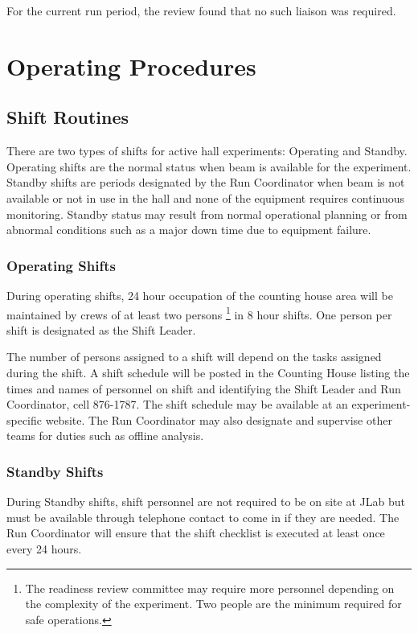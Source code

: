 \documentclass[11pt]{article}
\begin{document}
For the current run period, the review found that no such liaison was required. 


\section{Operating Procedures}

\subsection{Shift Routines}

There are two types of shifts for active hall experiments:
Operating and Standby. Operating shifts are the normal status
when beam is available for the experiment. Standby shifts are periods 
designated by the Run Coordinator when beam is not available or not in
use in the hall and none of the equipment requires
continuous monitoring. Standby status may result from normal operational
planning or from abnormal conditions such as a major down time due to
equipment failure.


\subsubsection{Operating Shifts}

During operating shifts, 24 hour occupation of the counting house area will 
be maintained by crews of at least two persons
\footnote{\label{fn2}The readiness review committee may require more 
personnel depending on the complexity of the experiment. Two people are 
the minimum required for safe operations.} 
in 8 hour shifts. One person per shift is designated as the Shift Leader.

The number of persons assigned to a shift will depend on the tasks assigned 
during the shift. A shift schedule will be posted in the Counting House 
listing the times and names of personnel on shift and identifying the 
Shift Leader and Run Coordinator, cell 876-1787. The shift schedule may be available at 
an experiment-specific website. The Run Coordinator may also designate 
and supervise other teams for duties such as offline analysis.

\subsubsection{Standby Shifts}

During Standby shifts, shift personnel are not required to be on site at 
JLab but must be available through telephone contact to come in if they
are needed.  The Run Coordinator will ensure that the shift
checklist is executed at least once every 24 hours.
\end{document}
